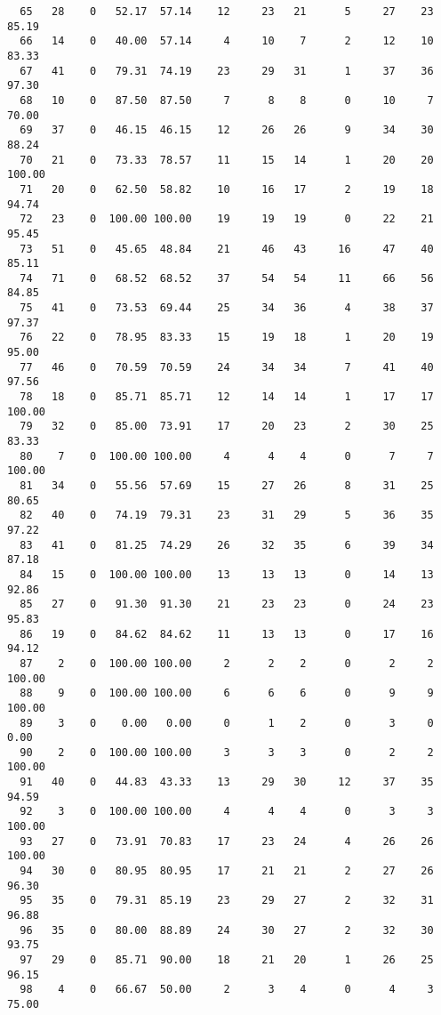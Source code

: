 \begin{verbatim}
  65   28    0   52.17  57.14    12     23   21      5     27    23    85.19
  66   14    0   40.00  57.14     4     10    7      2     12    10    83.33
  67   41    0   79.31  74.19    23     29   31      1     37    36    97.30
  68   10    0   87.50  87.50     7      8    8      0     10     7    70.00
  69   37    0   46.15  46.15    12     26   26      9     34    30    88.24
  70   21    0   73.33  78.57    11     15   14      1     20    20   100.00
  71   20    0   62.50  58.82    10     16   17      2     19    18    94.74
  72   23    0  100.00 100.00    19     19   19      0     22    21    95.45
  73   51    0   45.65  48.84    21     46   43     16     47    40    85.11
  74   71    0   68.52  68.52    37     54   54     11     66    56    84.85
  75   41    0   73.53  69.44    25     34   36      4     38    37    97.37
  76   22    0   78.95  83.33    15     19   18      1     20    19    95.00
  77   46    0   70.59  70.59    24     34   34      7     41    40    97.56
  78   18    0   85.71  85.71    12     14   14      1     17    17   100.00
  79   32    0   85.00  73.91    17     20   23      2     30    25    83.33
  80    7    0  100.00 100.00     4      4    4      0      7     7   100.00
  81   34    0   55.56  57.69    15     27   26      8     31    25    80.65
  82   40    0   74.19  79.31    23     31   29      5     36    35    97.22
  83   41    0   81.25  74.29    26     32   35      6     39    34    87.18
  84   15    0  100.00 100.00    13     13   13      0     14    13    92.86
  85   27    0   91.30  91.30    21     23   23      0     24    23    95.83
  86   19    0   84.62  84.62    11     13   13      0     17    16    94.12
  87    2    0  100.00 100.00     2      2    2      0      2     2   100.00
  88    9    0  100.00 100.00     6      6    6      0      9     9   100.00
  89    3    0    0.00   0.00     0      1    2      0      3     0     0.00
  90    2    0  100.00 100.00     3      3    3      0      2     2   100.00
  91   40    0   44.83  43.33    13     29   30     12     37    35    94.59
  92    3    0  100.00 100.00     4      4    4      0      3     3   100.00
  93   27    0   73.91  70.83    17     23   24      4     26    26   100.00
  94   30    0   80.95  80.95    17     21   21      2     27    26    96.30
  95   35    0   79.31  85.19    23     29   27      2     32    31    96.88
  96   35    0   80.00  88.89    24     30   27      2     32    30    93.75
  97   29    0   85.71  90.00    18     21   20      1     26    25    96.15
  98    4    0   66.67  50.00     2      3    4      0      4     3    75.00

\end{verbatim}
